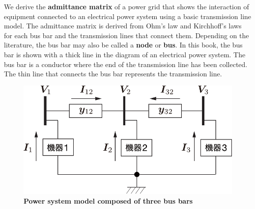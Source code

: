 \documentclass[graybox, envcountchap]{svmult}
\begin{document}
We derive the \textbf{admittance matrix} of a power grid that shows the
interaction of equipment connected to an electrical power system using a basic
transmission line model. The admittance matrix is derived from Ohm's law and
Kirchhoff's laws for each bus bar and the transmission lines that connect them.
Depending on the literature, the bus bar may also be called a \textbf{node} or
\textbf{bus}. In this book, the bus bar is shown with a thick line in the
diagram of an electrical power system.  The bus bar is a conductor where the end
of the transmission line has been collected. The thin line that connects the bus
bar represents the transmission line.

\begin{figure}[t]
  \centering
  \includegraphics[width = .60\linewidth]{figs/3busex}
  \medskip
  \caption{\textbf{Power system model composed of three bus bars}}
  \label{fig:3busex}
  \medskip
\end{figure}
\end{document}
